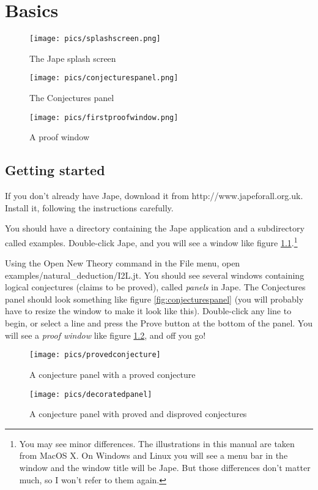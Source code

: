 \documentclass[11pt]{book}
\newcommand{\figref}[1]{figure \ref{fig:#1}}
\begin{document}
\tableofcontents

\chapter{Basics}


\begin{figure}
\centering
\texttt{[image: pics/splashscreen.png]}
\caption{The Jape splash screen}
\label{fig:splashscreen}
\end{figure}
\begin{figure}
\centering
\parbox[b]{165pt}{\centering
\texttt{[image: pics/conjecturespanel.png]}
\caption{The Conjectures panel}
\label{fig:conjecturespanel}}
\qquad
\parbox[b]{230pt}{\centering
\texttt{[image: pics/firstproofwindow.png]}
\caption{A proof window}
\label{fig:firstproofwindow}}
\end{figure}

\section{Getting started}

If you don't already have Jape, download it from http://www.japeforall.org.uk. Install it, following the instructions carefully.

You should have a directory containing the Jape application and a subdirectory called examples. Double-click Jape, and you will see a window like \figref{splashscreen}.\footnote{You may see minor differences. The illustrations in this manual are taken from MacOS X. On Windows and Linux you will see a menu bar in the window and the window title will be Jape. But those differences don't matter much, so I won't refer to them again.}

Using the Open New Theory command in  the File menu, open examples/natural\_deduction/I2L.jt. You should see several windows containing logical conjectures (claims to be proved), called \emph{panels} in Jape. The Conjectures panel should look something like \figref{conjecturespanel} (you will probably have to resize the window to make it look like this). Double-click any line to begin, or select a line and press the Prove button at the bottom of the panel. You will see a \emph{proof window} like \figref{firstproofwindow}, and off you go!

\begin{figure}
\centering
\parbox[b]{200pt}{\centering
\texttt{[image: pics/provedconjecture]}
\caption{A conjecture panel with a proved conjecture}
\label{fig:provedconjecture}}
\qquad
\parbox[b]{200pt}{\centering
\texttt{[image: pics/decoratedpanel]}
\caption{A conjecture panel with proved and disproved conjectures}
\label{fig:decoratedpanel}}
\end{figure}
\end{document}
